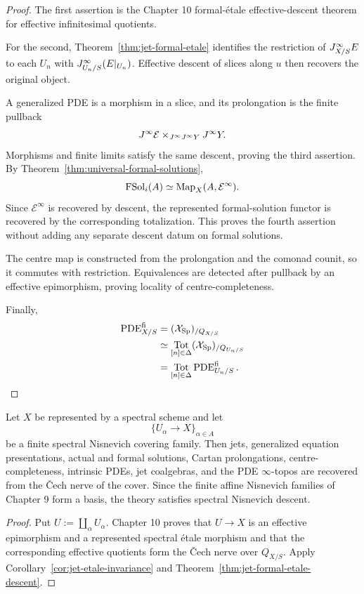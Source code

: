 \begin{proof}
The first assertion is the Chapter 10 formal-\'{e}tale effective-descent theorem for effective infinitesimal quotients.

For the second, Theorem~\ref{thm:jet-formal-etale} identifies the restriction of $J^{\infty}_{X/S}E$ to each $U_n$ with $J^{\infty}_{U_n/S}(E|_{U_n})$.  Effective descent of slices along $u$ then recovers the original object.

A generalized PDE is a morphism in a slice, and its prolongation is the finite pullback
\[
    J^{\infty}\mathcal E\times_{J^{\infty}J^{\infty} Y}J^{\infty} Y.
\]
Morphisms and finite limits satisfy the same descent, proving the third assertion.  By Theorem~\ref{thm:universal-formal-solutions},
\[
    \operatorname{FSol}_i(A)
    \simeq
    \operatorname{Map}_X(A,\mathcal E^\infty).
\]
Since $\mathcal E^\infty$ is recovered by descent, the represented formal-solution functor is recovered by the corresponding totalization.  This proves the fourth assertion without adding any separate descent datum on formal solutions.

The centre map is constructed from the prolongation and the comonad counit, so it commutes with restriction.  Equivalences are detected after pullback by an effective epimorphism, proving locality of centre-completeness.

Finally,
\[
\begin{aligned}
\operatorname{PDE}^{\mathrm{fi}}_{X/S}
&=(\mathcal{X}_{\mathrm{Sp}})_{/Q_{X/S}}\\
&\simeq
\operatorname*{Tot}_{[n]\in\Delta}(\mathcal{X}_{\mathrm{Sp}})_{/Q_{U_n/S}}\\
&=
\operatorname*{Tot}_{[n]\in\Delta}\operatorname{PDE}^{\mathrm{fi}}_{U_n/S}.
\end{aligned}
\]
\end{proof}

\begin{corollary}
\label{cor:jet-nisnevich-locality}
Let $X$ be represented by a spectral scheme and let
\[
    \{U_\alpha\to X\}_{\alpha\in A}
\]
be a finite spectral Nisnevich covering family.  Then jets, generalized equation presentations, actual and formal solutions, Cartan prolongations, centre-completeness, intrinsic PDEs, jet coalgebras, and the PDE $\infty$-topos are recovered from the \v{C}ech nerve of the cover.  Since the finite affine Nisnevich families of Chapter 9 form a basis, the theory satisfies spectral Nisnevich descent.
\end{corollary}

\begin{proof}
Put $U:=\coprod_\alpha U_\alpha$.  Chapter 10 proves that $U\to X$ is an effective epimorphism and a represented spectral \'{e}tale morphism and that the corresponding effective quotients form the \v{C}ech nerve over $Q_{X/S}$.  Apply Corollary~\ref{cor:jet-etale-invariance} and Theorem~\ref{thm:jet-formal-etale-descent}.
\end{proof}

